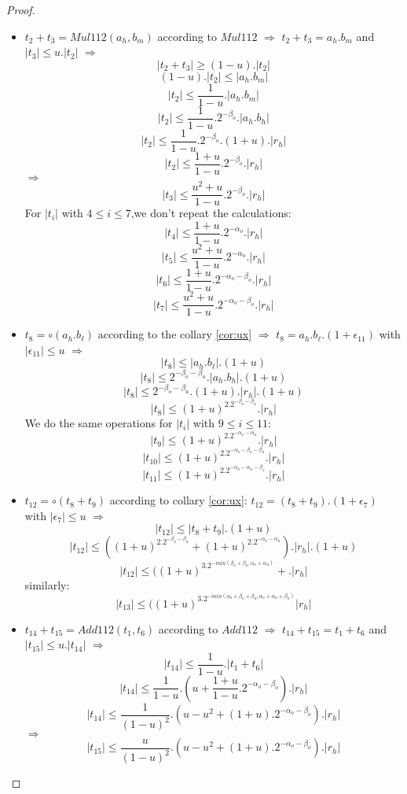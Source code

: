 \begin{proof}
\begin{itemize}
\item  $t_2 + t_3 = Mul112(a_h,b_m)$ according to $Mul112$ $\Rightarrow$ $t_2 + t_3 = a_h.b_m$ and $\lvert t_3 \rvert \le u. \lvert t_2 \rvert$ $\Rightarrow$
$$\lvert t_2 + t_3 \rvert \ge (1-u). \lvert t_2 \rvert $$
$$(1-u). \lvert t_2 \rvert \le \lvert  a_h.b_m \rvert $$
$$\lvert t_2 \rvert \le \frac{1}{1-u}.\lvert  a_h.b_m \rvert $$
$$\lvert t_2 \rvert \le \frac{1}{1-u}.2^{-\beta_o}. \lvert a_h.b_h \rvert $$
$$\lvert t_2 \rvert \le \frac{1}{1-u}.2^{-\beta_o}. (1+u).\lvert r_h \rvert $$
$$\lvert t_2 \rvert \le \frac{1+u}{1-u}.2^{-\beta_o}. \lvert r_h \rvert $$
$\Rightarrow$
$$\lvert t_3 \rvert \le \frac{u^2+u}{1-u}.2^{-\beta_o}. \lvert r_h \rvert $$
For $\lvert t_i \rvert $ with $4 \le i \le 7$,we don't repeat the calculations:
$$\lvert t_4 \rvert \le \frac{1+u}{1-u}.2^{-\alpha_o}. \lvert r_h \rvert $$
$$\lvert t_5 \rvert \le \frac{u^2+u}{1-u}.2^{-\alpha_o}. \lvert r_h \rvert $$
$$\lvert t_6 \rvert \le \frac{1+u}{1-u}.2^{-\alpha_o -\beta_o}. \lvert r_h \rvert $$
$$\lvert t_7 \rvert \le \frac{u^2+u}{1-u}.2^{-\alpha_o -\beta_o}. \lvert r_h \rvert $$
\item $t_8 = \circ(a_h.b_{\ell})$ according to the collary \ref{cor:ux} $\Rightarrow$ $t_8 = a_h.b_{\ell}.(1+\epsilon_{11})$ with $\lvert \epsilon_{11} \rvert \le u$ $\Rightarrow$
$$ \lvert t_8 \rvert \le \lvert a_h.b_{\ell} \rvert.(1+u)$$
$$ \lvert t_8 \rvert \le 2^{-\beta_o -\beta_u}. \lvert a_h.b_h \rvert.(1+u)$$
$$ \lvert t_8 \rvert \le 2^{-\beta_o -\beta_u}. (1+u).\lvert r_h \rvert.(1+u)$$
$$ \lvert t_8 \rvert \le (1+u)^2.2^{-\beta_o -\beta_u}.\lvert r_h \rvert$$
We do the same operations for $\lvert t_i \rvert $ with $9 \le i \le 11$:
$$ \lvert t_9 \rvert \le (1+u)^2.2^{-\alpha_o - \alpha_u}. \lvert r_h \rvert$$
$$ \lvert t_{10} \rvert \le (1+u)^2.2^{-\alpha_o -\beta_o -\beta_u}.\lvert r_h \rvert$$
$$ \lvert t_{11} \rvert \le (1+u)^2.2^{-\alpha_o - \alpha_u -\beta_o}. \lvert r_h \rvert$$
\item $t_{12} = \circ(t_8 + t_9)$ according to collary \ref{cor:ux}: $t_{12} = (t_8 + t_9).(1+\epsilon_7)$ with $\lvert \epsilon_7 \rvert \le u$ $\Rightarrow$ 
$$ \lvert t_{12} \rvert \le  \lvert t_8 + t_9 \rvert .(1+ u)$$
$$ \lvert t_{12} \rvert \le  ((1+u)^2.2^{-\beta_o -\beta_u} + (1+u)^2.2^{-\alpha_o - \alpha_u}).\lvert r_h \rvert .(1+ u)$$
$$ \lvert t_{12} \rvert \le  ((1+u)^3.2^{-min(\beta_o +\beta_u, \alpha_o + \alpha_u )} + .\lvert r_h \rvert $$
similarly:
$$ \lvert t_{13} \rvert \le  ((1+u)^3.2^{-min(\alpha_o +\beta_o +\beta_u,\alpha_o + \alpha_u +\beta_o)}  \lvert r_h \rvert$$
\item $t_{14} + t_{15} = Add112(t_1, t_6)$ according to $Add112$ $\Rightarrow$
$t_{14} + t_{15} = t_1+ t_6$ and $\lvert t_{15} \rvert \le u. \lvert t_{14} \rvert $ $\Rightarrow$
$$\lvert t_{14} \rvert \le \frac{1}{1-u}.\lvert  t_1 + t_6 \rvert $$
$$\lvert t_{14} \rvert \le \frac{1}{1-u}.(u + \frac{1+u}{1-u}.2^{-\alpha_o -\beta_o} ).\lvert r_h \rvert $$
$$\lvert t_{14} \rvert \le \frac{1}{(1-u)^2}.(u -u^2 + (1+u).2^{-\alpha_o -\beta_o} ).\lvert r_h \rvert $$
$\Rightarrow$
$$\lvert t_{15} \rvert \le \frac{u}{(1-u)^2}.(u -u^2 + (1+u).2^{-\alpha_o -\beta_o} ).\lvert r_h \rvert $$


\end{itemize}
\end{proof}
